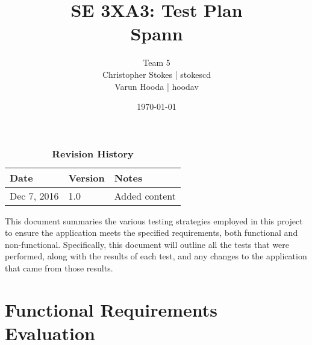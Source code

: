 \documentclass[12pt, titlepage]{article}
\title{SE 3XA3: Test Plan\\Spann}
\author{Team 5
  \\ Christopher Stokes | stokescd
  \\ Varun Hooda | hoodav
}
\date{\today}
\begin{document}
\maketitle

\tableofcontents
\listoftables

\begin{table}[bp]
\caption{\bf Revision History}
\begin{tabularx}{\textwidth}{p{3cm}p{2cm}X}
\toprule {\bf Date} & {\bf Version} & {\bf Notes}\\
\midrule
  Dec 7, 2016 & 1.0 & Added content\\
\bottomrule
\end{tabularx}
\end{table}

\clearpage


This document summaries the various testing strategies employed in this project
to ensure the application meets the specified requirements, both functional
and non-functional. Specifically, this document will outline all the tests that
were performed, along with the results of each test, and any changes to the
application that came from those results.

\section{Functional Requirements Evaluation}
\end{document}
